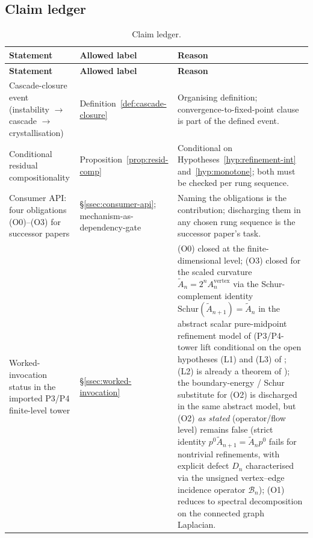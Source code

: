 \documentclass[11pt]{article}
\theoremstyle{definition}
\begin{document}
\subsection{Claim ledger}\label{ssec:claim-ledger}

\renewcommand{\arraystretch}{1.20}
\begin{longtable}{>{\raggedright\arraybackslash}p{}>{\raggedright\arraybackslash}p{}>{\raggedright\arraybackslash}p{}}
\caption{Claim ledger.}\label{tab:claim-ledger}\\
\toprule
\textbf{Statement} & \textbf{Allowed label} & \textbf{Reason} \\
\midrule
\endfirsthead
\toprule
\textbf{Statement} & \textbf{Allowed label} & \textbf{Reason} \\
\midrule
\endhead
Cascade-closure event (instability $\to$ cascade $\to$ crystallisation)
& Definition~\ref{def:cascade-closure}
& Organising definition; convergence-to-fixed-point clause is part of the defined event. \\
Conditional residual compositionality
& Proposition~\ref{prop:resid-comp}
& Conditional on Hypotheses~\ref{hyp:refinement-int} and~\ref{hyp:monotone}; both must be checked per rung sequence. \\
Consumer API: four obligations (O0)--(O3) for successor papers
& \S\ref{ssec:consumer-api}; mechanism-as-dependency-gate
& Naming the obligations is the contribution; discharging them in any chosen rung sequence is the successor paper's task. \\
Worked-invocation status in the imported P3/P4 finite-level tower
& \S\ref{ssec:worked-invocation}
& (O0) closed at the finite-dimensional level; (O3) closed for the scaled curvature $\widetilde A_n = 2^n A_n^{\mathrm{vertex}}$ via the Schur-complement identity $\mathrm{Schur}(\widetilde A_{n+1}) = \widetilde A_n$ in the abstract scalar pure-midpoint refinement model of \cite[\S\texttt{sec:scope-and-gap}]{CascadeRefinementCompat} (P3/P4-tower lift conditional on the open hypotheses (L1) and (L3) of \cite[\S\texttt{sec:scope-and-gap}]{CascadeRefinementCompat}; (L2) is already a theorem of \cite{CascadeRefinementSpaces}); the boundary-energy / Schur substitute for (O2) is discharged in the same abstract model, but (O2) \emph{as stated} (operator/flow level) remains false (strict identity $p^{0} \widetilde A_{n+1} = \widetilde A_n p^{0}$ fails for nontrivial refinements, with explicit defect $D_n$ characterised via the unsigned vertex--edge incidence operator $\mathcal{B}_n$); (O1) reduces to spectral decomposition on the connected graph Laplacian. \\

\end{longtable}
\end{document}
